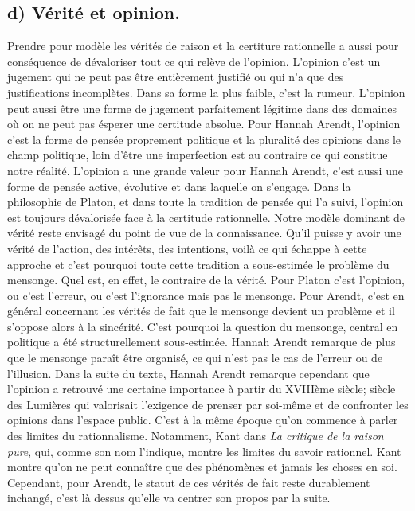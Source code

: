 \documentclass[12pt]{article}
\begin{document}
\subsection*{d) Vérité et opinion.}
Prendre pour modèle les vérités de raison et la certiture rationnelle a aussi pour conséquence de dévaloriser tout ce qui relève de l'opinion.
L'opinion c'est un jugement qui ne peut pas être entièrement justifié ou qui n'a que des justifications incomplètes.
Dans sa forme la plus faible, c'est la rumeur.
L'opinion peut aussi être une forme de jugement parfaitement légitime dans des domaines où on ne peut pas ésperer une certitude absolue.
Pour Hannah Arendt, l'opinion c'est la forme de pensée proprement politique et la pluralité des opinions dans le champ politique, loin d'être une imperfection est au contraire ce qui constitue notre réalité.
L'opinion a une grande valeur pour Hannah Arendt, c'est aussi une forme de pensée active, évolutive et dans laquelle on s'engage.
Dans la philosophie de Platon, et dans toute la tradition de pensée qui l'a suivi, l'opinion est toujours dévalorisée face à la certitude rationnelle.
Notre modèle dominant de vérité reste envisagé du point de vue de la connaissance.
Qu'il puisse y avoir une vérité de l'action, des intérêts, des intentions, voilà ce qui échappe à cette approche et c'est pourquoi toute cette tradition a sous-estimée le problème du mensonge.
Quel est, en effet, le contraire de la vérité.
Pour Platon c'est l'opinion, ou c'est l'erreur, ou c'est l'ignorance mais pas le mensonge.
Pour Arendt, c'est en général concernant les vérités de fait que le mensonge devient un problème et il s'oppose alors à la sincérité.
C'est pourquoi la question du mensonge, central en politique a été structurellement sous-estimée.
Hannah Arendt remarque de plus que le mensonge paraît être organisé, ce qui n'est pas le cas de l'erreur ou de l'illusion.
Dans la suite du texte, Hannah Arendt remarque cependant que l'opinion a retrouvé une certaine importance à partir du XVIIIème siècle; siècle des Lumières qui valorisait l'exigence de prenser par soi-même et de confronter les opinions dans l'espace public.
C'est à la même époque qu'on commence à parler des limites du rationnalisme.
Notamment, Kant dans \emph{La critique de la raison pure}, qui, comme son nom l'indique, montre les limites du savoir rationnel.
Kant montre qu'on ne peut connaître que des phénomènes et jamais les choses en soi.
Cependant, pour Arendt, le statut de ces vérités de fait reste durablement inchangé, c'est là dessus qu'elle va centrer son propos par la suite.
\end{document}
